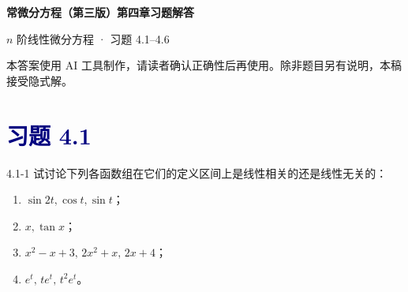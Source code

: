 \documentclass[UTF8,a4paper,11pt]{ctexart}
\newcommand{\sect}[1]{\section*{\textcolor{navy}{习题 #1}}}
\begin{document}
\begin{center}
  {\LARGE\bfseries\color{navy}常微分方程（第三版）第四章习题解答\par}
  \vspace{0.35em}
  {\color{pink}$n$ 阶线性微分方程 · 习题 4.1--4.6\par}
\end{center}
\begin{center}
  \small\color{gray}本答案使用 AI 工具制作，请读者确认正确性后再使用。除非题目另有说明，本稿接受隐式解。
\end{center}

\sect{4.1}
\begin{problem}{4.1-1}
试讨论下列各函数组在它们的定义区间上是线性相关的还是线性无关的：
  \begin{enumerate}[label=(\arabic*)]
    \item $\sin 2t,\cos t,\sin t$；
    \item $x,\tan x$；
    \item $x^2-x+3,\,2x^2+x,\,2x+4$；
    \item $e^t,\,te^t,\,t^2e^t$。
  \end{enumerate}
\end{problem}
\end{document}
